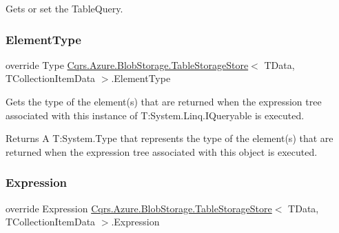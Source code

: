 Gets or set the Table\+Query. 

\mbox{\label{classCqrs_1_1Azure_1_1BlobStorage_1_1TableStorageStore_a57e68c383098e81303eeebe0b85c970c_a57e68c383098e81303eeebe0b85c970c}} 
\subsubsection{\texorpdfstring{Element\+Type}{ElementType}}
{\footnotesize\ttfamily override Type \hyperlink{classCqrs_1_1Azure_1_1BlobStorage_1_1TableStorageStore}{Cqrs.\+Azure.\+Blob\+Storage.\+Table\+Storage\+Store}$<$ T\+Data, T\+Collection\+Item\+Data $>$.Element\+Type\hspace{0.3cm}{\ttfamily [get]}}



Gets the type of the element(s) that are returned when the expression tree associated with this instance of T\+:\+System.\+Linq.\+I\+Queryable is executed. 

\begin{DoxyReturn}{Returns}
A T\+:\+System.\+Type that represents the type of the element(s) that are returned when the expression tree associated with this object is executed. 
\end{DoxyReturn}
\mbox{\label{classCqrs_1_1Azure_1_1BlobStorage_1_1TableStorageStore_af7d55541709a0519bdb0b5d201c5a97c_af7d55541709a0519bdb0b5d201c5a97c}} 
\subsubsection{\texorpdfstring{Expression}{Expression}}
{\footnotesize\ttfamily override Expression \hyperlink{classCqrs_1_1Azure_1_1BlobStorage_1_1TableStorageStore}{Cqrs.\+Azure.\+Blob\+Storage.\+Table\+Storage\+Store}$<$ T\+Data, T\+Collection\+Item\+Data $>$.Expression\hspace{0.3cm}{\ttfamily [get]}}



